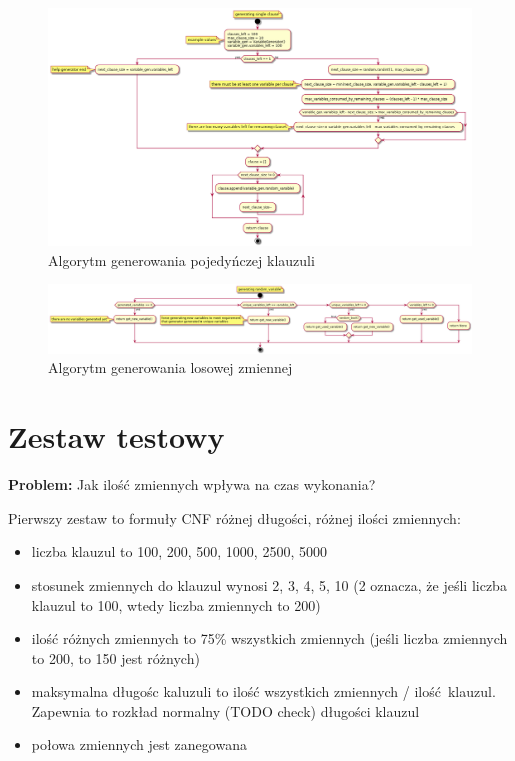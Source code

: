 \documentclass[a4paper,12pt]{article}
\begin{document}
\begin{figure}[H]
  \centering
  \includegraphics[width=\textwidth]{logic-formula-generator/clause_generator.png}
  \caption{Algorytm generowania pojedyńczej klauzuli}
\end{figure}

\begin{figure}[H]
  \centering
  \includegraphics[width=\textwidth]{logic-formula-generator/variable_generator.png}
  \caption{Algorytm generowania losowej zmiennej}
\end{figure}

\newpage

\section{Zestaw testowy}
\noindent
\textbf{Problem:} Jak ilość zmiennych wpływa na czas wykonania?

Pierwszy zestaw to formuły CNF różnej długości, różnej ilości zmiennych:
\begin{itemize}
  \item liczba klauzul to 100, 200, 500, 1000, 2500, 5000
  \item stosunek zmiennych do klauzul wynosi 2, 3, 4, 5, 10 (2 oznacza, że jeśli liczba klauzul to 100, wtedy liczba zmiennych to 200)
  \item ilość różnych zmiennych to 75\% wszystkich zmiennych (jeśli liczba zmiennych to 200, to 150 jest różnych)
  \item maksymalna długośc kaluzuli to ilość wszystkich zmiennych / ilość klauzul. Zapewnia to rozkład normalny (TODO check) długości klauzul
  \item połowa zmiennych jest zanegowana
\end{itemize}
\end{document}
